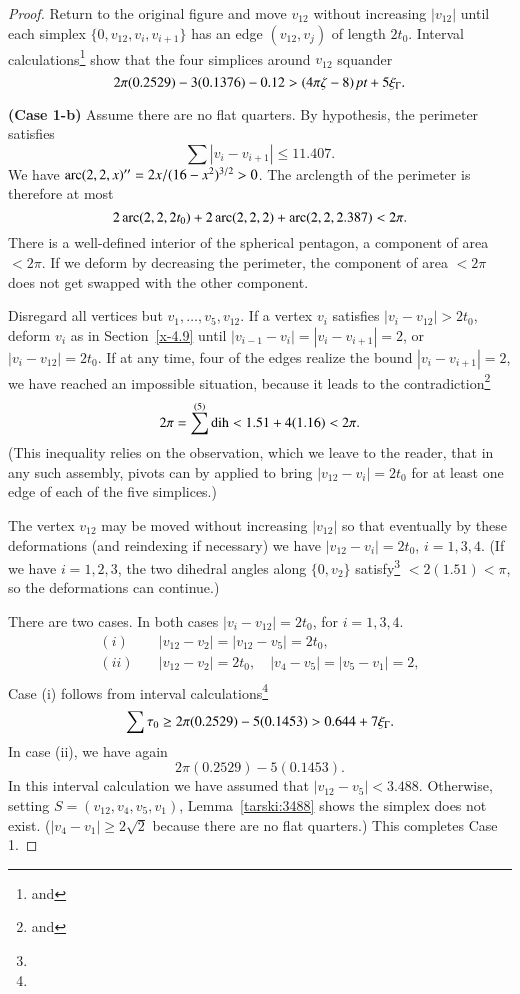 \begin{proof}
Return to the original figure and move $v_{12}$ without increasing
$|v_{12}|$ until each simplex $\{0,v_{12},v_i,v_{i+1}\}$ has an edge
$(v_{12},v_j)$ of length $2t_0$. Interval
calculations\footnote{ and } show
that the four simplices around $v_{12}$ squander
    $$2\pi(0.2529)-3(0.1376)-0.12 > (4\pi\zeta-8)\,\hbox{\it pt} + 5\xi_\Gamma.$$

{\bf (Case 1-b)} Assume there are no flat quarters. By hypothesis,
the perimeter satisfies $$\sum|v_i-v_{i+1}|\le 11.407.$$ We have
$\operatorname{arc}(2,2,x)'' = 2x/(16-x^2)^{3/2} >0$. The arclength of the
perimeter is therefore at most
$$2\operatorname{arc}(2,2,2t_0) + 2\operatorname{arc}(2,2,2) + \operatorname{arc}(2,2,2.387) <  2\pi.$$
There is a well-defined interior of the spherical pentagon, a
component of area $<2\pi$.  If we deform by decreasing the
perimeter, the component of area $<2\pi$ does not get swapped with
the other component.

Disregard all vertices but $v_1,\ldots,v_5,v_{12}$.  If a vertex
$v_i$ satisfies  $|v_i-v_{12}|>2t_0$, deform $v_i$ as in
Section~\ref{x-4.9} until $|v_{i-1}-v_{i}|=|v_i-v_{i+1}|=2$, or
$|v_i-v_{12}|=2t_0$. If at any time, four of the edges realize the
bound $|v_i-v_{i+1}|=2$, we have reached an impossible situation,
because it leads to the contradiction\footnote{
and }
    $$2\pi = \sum^{(5)}\operatorname{dih} < 1.51 + 4 (1.16) < 2\pi.$$
(This inequality relies on the observation, which we leave to the
reader, that in any such assembly, pivots can by applied to bring
$|v_{12}-v_i|=2t_0$ for at least one edge of each of the five
simplices.)



The vertex $v_{12}$ may be moved without increasing $|v_{12}|$ so
that eventually by these deformations (and reindexing if
necessary) we have $|v_{12}-v_i|=2t_0$, $i=1,3,4$. (If we have
$i=1,2,3$, the two dihedral angles along $\{0,v_2\}$
satisfy\footnote{} $<2(1.51)<\pi$, so the
deformations can continue.)



There are two cases. In both cases $|v_i-v_{12}|=2t_0$, for
$i=1,3,4$.
$$
\begin{array}{lll}
(i)\quad &|v_{12}-v_2|=|v_{12}-v_5|=2t_0,\\
(ii)\quad &|v_{12}-v_2|=2t_0,\quad |v_4-v_5|=|v_5-v_1|=2,\\
\end{array}
$$
Case (i) follows from interval
calculations\footnote{}
$$
\sum\tau_0 \ge 2\pi(0.2529) - 5 (0.1453) > 0.644+7\xi_\Gamma.
$$
In case (ii), we have again
    $$2\pi(0.2529)-5 (0.1453).$$
In this interval calculation we have assumed that
$|v_{12}-v_5|<3.488$. Otherwise, setting $S=(v_{12},v_4,v_5,v_1)$, Lemma~\ref{tarski:3488}
shows the simplex does not exist.
($|v_4-v_1|\ge2\sqrt2$ because
there are no flat quarters.)
This completes Case 1.


\end{proof}
